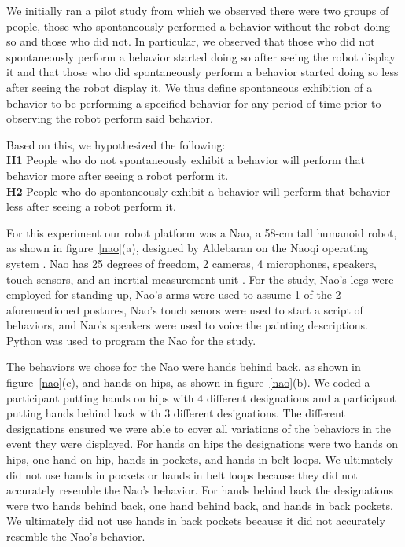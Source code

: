 \documentclass{acm_proc_article-sp}
\begin{document}
We initially ran a pilot study from which we observed there were two groups of people, those who spontaneously performed a behavior without the robot doing so and those who did not. In particular, we observed that those who did not spontaneously perform a behavior started doing so after seeing the robot display it and that those who did spontaneously perform a behavior started doing so less after seeing the robot display it. We thus define spontaneous exhibition of a behavior to be performing a specified behavior for any period of time prior to observing the robot perform said behavior.

Based on this, we hypothesized the following:\\
\textbf{H1}	People who do not spontaneously exhibit a behavior will perform that behavior more after seeing a robot perform it.\\
\textbf{H2} People who do spontaneously exhibit a behavior will perform that behavior less after seeing a robot perform it.

For this experiment our robot platform was a Nao, a 58-cm tall humanoid robot, as shown in figure~\ref{nao}(a), designed by Aldebaran on the Naoqi operating system \cite{naodocumentation}. Nao has 25 degrees of freedom, 2 cameras, 4 microphones, speakers, touch sensors, and an inertial measurement unit \cite{naodocumentation}. For the study, Nao's legs were employed for standing up, Nao's arms were used to assume 1 of the 2 aforementioned postures, Nao's touch senors were used to start a script of behaviors, and Nao's speakers were used to voice the painting descriptions. Python was used to program the Nao for the study. 

The behaviors we chose for the Nao were hands behind back, as shown in figure~\ref{nao}(c), and hands on hips, as shown in figure~\ref{nao}(b). We coded a participant putting hands on hips with 4 different designations and a participant putting hands behind back with 3 different designations. The different designations ensured we were able to cover all variations of the behaviors in the event they were displayed. For hands on hips the designations were two hands on hips, one hand on hip, hands in pockets, and hands in belt loops. We ultimately did not use hands in pockets or hands in belt loops because they did not accurately resemble the Nao's behavior. For hands behind back the designations were two hands behind back, one hand behind back, and hands in back pockets. We ultimately did not use hands in back pockets because it did not accurately resemble the Nao's behavior. 
\end{document}
